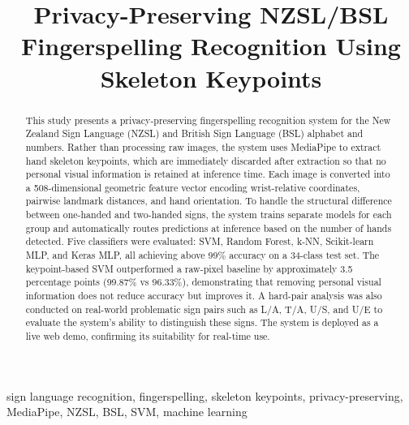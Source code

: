 \documentclass[conference]{IEEEtran}
\begin{document}
\title{Privacy-Preserving NZSL/BSL Fingerspelling Recognition Using Skeleton Keypoints}

\author{%
}

\maketitle

\begin{abstract}
This study presents a privacy-preserving fingerspelling recognition system for the New Zealand Sign Language (NZSL) and British Sign Language (BSL) alphabet and numbers. Rather than processing raw images, the system uses MediaPipe to extract hand skeleton keypoints, which are immediately discarded after extraction so that no personal visual information is retained at inference time. Each image is converted into a 508-dimensional geometric feature vector encoding wrist-relative coordinates, pairwise landmark distances, and hand orientation. To handle the structural difference between one-handed and two-handed signs, the system trains separate models for each group and automatically routes predictions at inference based on the number of hands detected. Five classifiers were evaluated: SVM, Random Forest, k-NN, Scikit-learn MLP, and Keras MLP, all achieving above 99\% accuracy on a 34-class test set. The keypoint-based SVM outperformed a raw-pixel baseline by approximately 3.5 percentage points (99.87\% vs 96.33\%), demonstrating that removing personal visual information does not reduce accuracy but improves it. A hard-pair analysis was also conducted on real-world problematic sign pairs such as L/A, T/A, U/S, and U/E to evaluate the system's ability to distinguish these signs. The system is deployed as a live web demo, confirming its suitability for real-time use.
\end{abstract}

\begin{IEEEkeywords}
sign language recognition, fingerspelling, skeleton keypoints, privacy-preserving, MediaPipe, NZSL, BSL, SVM, machine learning
\end{IEEEkeywords}
\end{document}
